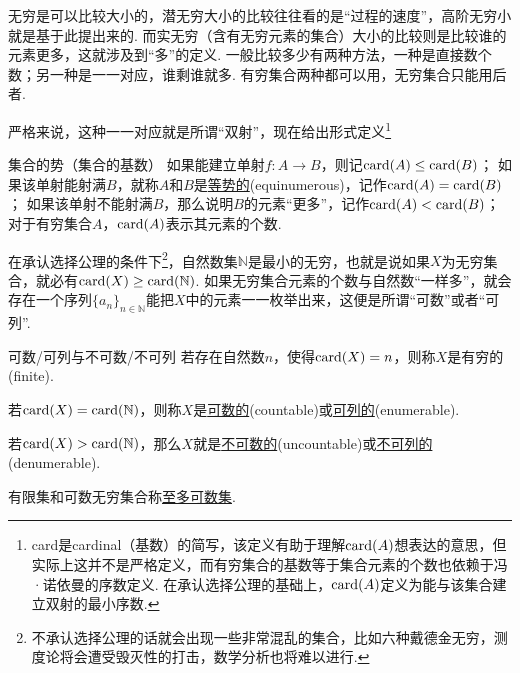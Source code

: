 \documentclass[main.tex]{subfiles}
\begin{document}
无穷是可以比较大小的，潜无穷大小的比较往往看的是“过程的速度”，高阶无穷小就是基于此提出来的. 而实无穷（含有无穷元素的集合）大小的比较则是比较谁的元素更多，这就涉及到“多”的定义. 一般比较多少有两种方法，一种是直接数个数；另一种是一一对应，谁剩谁就多. 有穷集合两种都可以用，无穷集合只能用后者.

严格来说，这种一一对应就是所谓“双射”，现在给出形式定义\footnote{card是cardinal（基数）的简写，该定义有助于理解\({\rm card}(A)\)想表达的意思，但实际上这并不是严格定义，而有穷集合的基数等于集合元素的个数也依赖于冯·诺依曼的序数定义. 在承认选择公理的基础上，\({\rm card}(A)\)定义为能与该集合建立双射的最小序数.}
\begin{definition}{集合的势（集合的基数）}
    如果能建立单射\(f:A \to B\)，则记\({\rm card}(A) \leq {\rm card}(B)\)；
    \newline
    如果该单射能射满\(B\)，就称\(A\)和\(B\)是\uline{等势的}(equinumerous)，记作\({\rm card}(A)={\rm card}(B)\)；
    \newline
    如果该单射不能射满\(B\)，那么说明\(B\)的元素“更多”，记作\({\rm card}(A)<{\rm card}(B)\)；
    \newline
    对于有穷集合\(A\)，\({\rm card}(A)\)表示其元素的个数.
\end{definition}

在承认选择公理的条件下\footnote{不承认选择公理的话就会出现一些非常混乱的集合，比如六种戴德金无穷，测度论将会遭受毁灭性的打击，数学分析也将难以进行.}，自然数集\(\mathbb{N}\)是最小的无穷，也就是说如果\(X\)为无穷集合，就必有\({\rm card}(X)\geq{\rm card}(\mathbb{N})\). 如果无穷集合元素的个数与自然数“一样多”，就会存在一个序列\(\{a_n\}_{n\in\mathbb{N}}\)能把\(X\)中的元素一一枚举出来，这便是所谓“可数”或者“可列”.

\begin{definition}{可数/可列与不可数/不可列}
    若存在自然数\(n\)，使得\({\rm card}(X)=n\)，则称\(X\)是有穷的(finite).
    \par
    若\({\rm card}(X)={\rm card}(\mathbb{N})\)，则称\(X\)是\uline{可数的}(countable)或\uline{可列的}(enumerable). 
    \par
    若\({\rm card}(X)>{\rm card}(\mathbb{N})\)，那么\(X\)就是\uline{不可数的}(uncountable)或\uline{不可列的}(denumerable).
    \par
    有限集和可数无穷集合称\uline{至多可数集}.
\end{definition}
\end{document}
